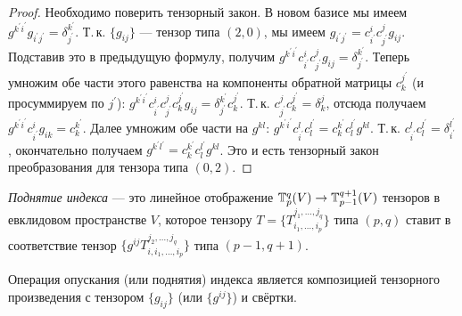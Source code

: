 \begin{proof}
    Необходимо поверить тензорный закон. В новом базисе мы имеем $g^{k^\prime i^\prime}g_{i^\prime j^\prime} = \delta^{k^\prime}_{j^\prime}$. Т.\,к. $\{g_{ij}\}$ --- тензор типа $(2, 0)$, мы имеем $g_{i^\prime j^\prime} = c^i_{i^\prime}c^j_{j^\prime}g_{ij}$. Подставив это в предыдущую формулу, получим $g^{k^\prime i^\prime}c^i_{i^\prime}c^j_{j^\prime}g_{ij} = \delta^{k^\prime}_{j^\prime}$. Теперь умножим обе части этого равенства на компоненты обратной матрицы $c^{j^\prime}_k$ (и просуммируем по $j^\prime$): $g^{k^\prime i^\prime}c^i_{i^\prime}c^j_{j^\prime}c^{j^\prime}_kg_{ij} = \delta^{k^\prime}_{j^\prime}c^{j^\prime}_k$. Т.\,к. $c^j_{j^\prime}c^{j^\prime}_k = \delta^j_k$, отсюда получаем $g^{k^\prime i^\prime}c^i_{i^\prime}g_{ik} = c^{k^\prime}_k$. Далее умножим обе части на $g^{kl}$: $g^{k^\prime i^\prime}c^l_{i^\prime}c^{l^\prime}_l = c^{k^\prime}_kc^{l^\prime}_lg^{kl}$. Т.\,к. $c^l_{i^\prime}c^{l^\prime}_l = \delta^{l^\prime}_{i^\prime}$, окончательно получаем $g^{k^\prime l^\prime} = c^{k^\prime}_kc^{l^\prime}_lg^{kl}$. Это и есть тензорный закон преобразования для тензора типа $(0, 2)$.
\end{proof}

\begin{definition}
    \textit{Поднятие индекса} --- это линейное отображение $\mathbb{T}_p^q(V) \to \mathbb{T}_{p - 1}^{q + 1}(V)$ тензоров в евклидовом пространстве $V$, которое тензору $T = \{T_{i_1, \ldots, i_p}^{j_1, \ldots, j_q}\}$ типа $(p, q)$ ставит в соответствие тензор $\{g^{ij}T_{i, i_1, \ldots, i_p}^{j_2, \ldots, j_q}\}$ типа $(p - 1, q + 1)$.
\end{definition}

Операция опускания (или поднятия) индекса является композицией тензорного произведения с тензором $\{g_{ij}\}$ (или $\{g^{ij}\}$) и свёртки.

